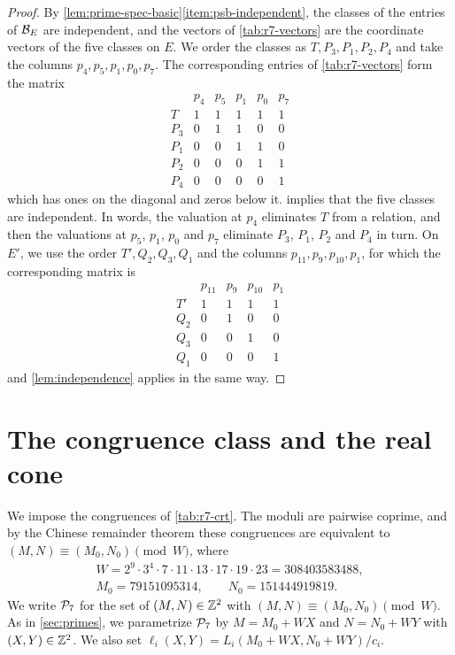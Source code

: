 \begin{proof}
By \cref{lem:prime-spec-basic}\ref{item:psb-independent}, the classes of
the entries of $\mathcal B_E$ are independent, and the vectors of
\cref{tab:r7-vectors} are the coordinate vectors of the five classes on
$E$. We order the classes as $T,P_3,P_1,P_2,P_4$ and take the columns
$p_4,p_5,p_1,p_0,p_7$. The
corresponding entries of \cref{tab:r7-vectors} form the matrix
\[
\begin{array}{c|ccccc}
 & p_4 & p_5 & p_1 & p_0 & p_7\\\hline
 T & 1 & 1 & 1 & 1 & 1\\
 P_3 & 0 & 1 & 1 & 0 & 0\\
 P_1 & 0 & 0 & 1 & 1 & 0\\
 P_2 & 0 & 0 & 0 & 1 & 1\\
 P_4 & 0 & 0 & 0 & 0 & 1
\end{array}
\]
which has ones on the diagonal and zeros below it. 
implies that the five classes are independent. In words, the valuation at
$p_4$ eliminates $T$ from a relation, and then the valuations at $p_5$,
$p_1$, $p_0$ and $p_7$ eliminate $P_3$, $P_1$, $P_2$ and $P_4$ in turn. On $E'$,
we use the order $T',Q_2,Q_3,Q_1$ and the columns $p_{11},p_9,p_{10},p_1$,
for which the corresponding matrix is
\[
\begin{array}{c|cccc}
 & p_{11} & p_9 & p_{10} & p_1\\\hline
 T' & 1 & 1 & 1 & 1\\
 Q_2 & 0 & 1 & 0 & 0\\
 Q_3 & 0 & 0 & 1 & 0\\
 Q_1 & 0 & 0 & 0 & 1
\end{array}
\]
and \cref{lem:independence} applies in the same way.
\end{proof}

\section{The congruence class and the real cone}\label{sec:r7-progression}

We impose the congruences of \cref{tab:r7-crt}. The moduli are pairwise
coprime, and by the Chinese remainder theorem these congruences are
equivalent to $(M,N)\equiv(M_0,N_0)\pmod W$, where
\begin{equation}\label{r7:crt}
\begin{gathered}
 W=2^9\cdot3^4\cdot7\cdot11\cdot13\cdot17\cdot19\cdot23=308403583488,\\
 M_0=79151095314,\qquad N_0=151444919819.
\end{gathered}
\end{equation}
We write $\mathcal P_7$ for the set of $(M,N)\in\mathbb Z^2$ with
$(M,N)\equiv(M_0,N_0)\pmod W$. As in \cref{sec:primes}, we parametrize
$\mathcal P_7$ by $M=M_0+WX$ and $N=N_0+WY$ with $(X,Y)\in\mathbb Z^2$. We also set
$\ell_i(X,Y)=L_i(M_0+WX,N_0+WY)/c_i$.

